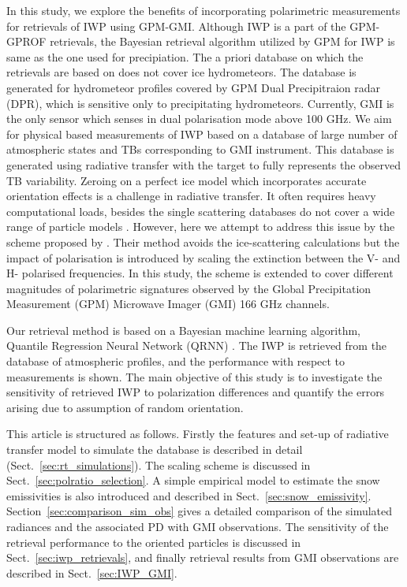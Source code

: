 \documentclass[amt, manuscript]{copernicus}
\begin{document}
In this study, we explore the benefits of incorporating polarimetric measurements for retrievals of IWP using GPM-GMI. Although IWP is a part of the GPM-GPROF retrievals, the Bayesian retrieval algorithm utilized by GPM for IWP is same as the one used for precipiation. The a priori database on which the retrievals are based on does not cover ice hydrometeors. The database is generated for hydrometeor profiles covered by GPM Dual Precipitraion radar (DPR), which is sensitive only to precipitating hydrometeors. Currently, GMI is the only sensor which senses in dual polarisation mode above 100\,\,GHz. We aim for physical based measurements of IWP based on a database of large number of atmospheric states and TBs corresponding to GMI instrument. This database is generated using radiative transfer with the target to fully represents the observed TB variability. Zeroing on a perfect ice model which incorporates accurate orientation effects is a challenge in radiative transfer. It often requires heavy computational loads, besides the single scattering databases do not cover a wide range of particle models \citep{brath:micro:20}. However, here we attempt to address this issue by the scheme proposed by \citet{barlakas:intro:21}. Their method avoids the ice-scattering calculations but the impact of polarisation is introduced by scaling the extinction between the V- and H- polarised frequencies. In this study, the scheme is extended to cover different magnitudes of polarimetric signatures observed by the Global Precipitation Measurement (GPM) Microwave Imager (GMI) 166\,\,GHz channels. 

Our retrieval method is based on a Bayesian machine learning algorithm, Quantile Regression Neural Network (QRNN) \citep{pfreundschuh:aneur:18}. The IWP is retrieved from the database of atmospheric profiles, and the performance with respect to measurements is shown. The main objective of this study is to investigate the sensitivity of retrieved IWP to polarization differences and  quantify the errors arising due to assumption of random orientation.

This article is structured as follows. Firstly the features and  set-up of radiative transfer model to simulate the database is described in detail (Sect.~\ref{sec:rt_simulations}). The scaling scheme is discussed in Sect.~\ref{sec:polratio_selection}. A simple empirical model to estimate the snow emissivities is also introduced and described in Sect.~\ref{sec:snow_emissivity}. Section~\ref{sec:comparison_sim_obs} gives a detailed comparison of the simulated radiances and the associated PD with GMI observations. The sensitivity of the retrieval performance to the oriented particles is discussed in Sect.~\ref{sec:iwp_retrievals}, and finally retrieval results from GMI observations are described in Sect.~\ref{sec:IWP_GMI}.
 
\end{document}
